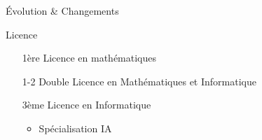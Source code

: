 \documentclass[hyperref={bookmarks=false},aspectratio=169]{beamer}
\begin{document}
\begin{frame}{Évolution \& Changements}
  \begin{alertblock}{Licence}
    \begin{itemize}
      \item[1ère] Licence en mathématiques
      \item[1-2] Double Licence en Mathématiques et Informatique
      \item[3ème] Licence en Informatique
      \begin{itemize}
        \item Spécialisation IA
      \end{itemize}
    \end{itemize}
  \end{alertblock}

\end{frame}
\end{document}
